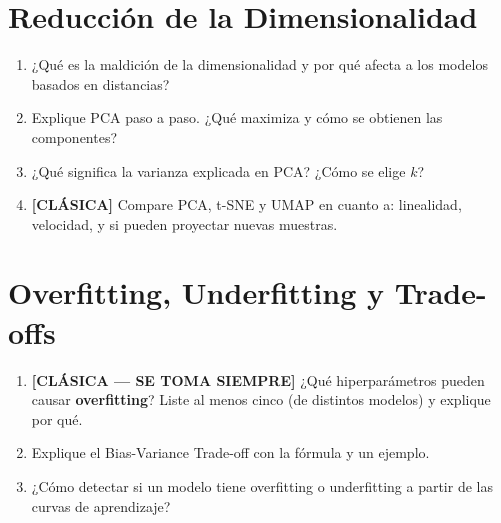 \documentclass[11pt,a4paper]{article}
\begin{document}
\section{Reducci\'on de la Dimensionalidad}

\begin{enumerate}[label=\textbf{P\arabic*.}, resume]

\item ¿Qu\'e es la maldici\'on de la dimensionalidad y por qu\'e afecta a los modelos
  basados en distancias?

\item Explique PCA paso a paso. ¿Qu\'e maximiza y c\'omo se obtienen las componentes?

\item ¿Qu\'e significa la varianza explicada en PCA? ¿C\'omo se elige $k$?

\item \leavevmode

\begin{classicbox}
\textcolor{tdred}{\textbf{[CL\'ASICA]}} Compare PCA, t-SNE y UMAP en cuanto a:
linealidad, velocidad, y si pueden proyectar nuevas muestras.
\end{classicbox}

\end{enumerate}

\section{Overfitting, Underfitting y Trade-offs}

\begin{enumerate}[label=\textbf{P\arabic*.}, resume]

\item \leavevmode

\begin{classicbox}
\textcolor{tdred}{\textbf{[CL\'ASICA --- SE TOMA SIEMPRE]}}
¿Qu\'e hiperpar\'ametros pueden causar \textbf{overfitting}? Liste al menos cinco
(de distintos modelos) y explique por qu\'e.
\end{classicbox}

\item Explique el Bias-Variance Trade-off con la f\'ormula y un ejemplo.

\item ¿C\'omo detectar si un modelo tiene overfitting o underfitting a partir de las
  curvas de aprendizaje?

\end{enumerate}
\end{document}
